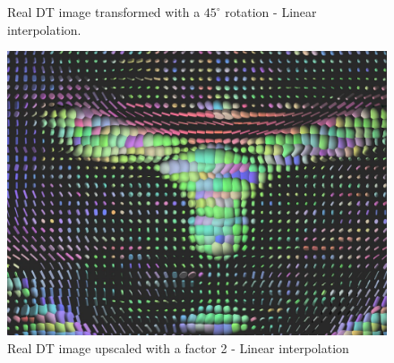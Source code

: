 \documentclass{InsightArticle}
\begin{document}
\begin{figure}[ht]
\begin{minipage}[b]{0.5\linewidth}
\caption[Tensor Transformation]{Real DT image transformed with a $45^{\circ}$ rotation - Linear
interpolation.\\}
\label{fig:figure2}
\end{minipage}
\begin{minipage}[b]{0.5\linewidth}
\centering
\includegraphics[width=.95\textwidth]{scale-zoomed.jpg}
\caption[Tensor Transformation]{Real DT image upscaled with a factor 2 - Linear
interpolation}
\label{fig:figure3}
\end{minipage}
\end{figure}
\clearpage

%
%



\end{document}
